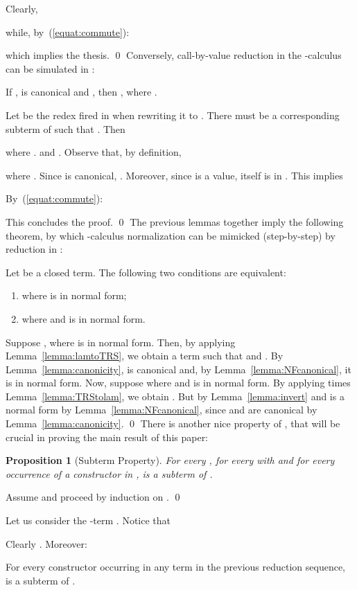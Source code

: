 \documentclass{LMCS}
\newtheorem{proposition}{Proposition}
\begin{document}
Clearly,

while, by~(\ref{equat:commute}):

which implies the thesis.
\qed
Conversely, call-by-value reduction in the -calculus can be simulated in :
\begin{lem}\label{lemma:lamtoTRS}
If ,  is canonical and , then
, where .
\end{lem}
\proof
Let  be the redex fired in  when rewriting
it to . There must be a corresponding subterm  of  such
that . Then

where .
and . Observe that, by definition,

where . Since  is canonical, 
. Moreover, since  is a value,
 itself is in . This implies
   
By~(\ref{equat:commute}):

This concludes the proof.
\qed
The previous lemmas together imply the following theorem, by which -calculus
normalization can be mimicked (step-by-step) by reduction in :
\begin{thm}\label{theo:termreducible}
Let  be a closed term. The following
two conditions are equivalent:
\begin{enumerate}[\em 1.]
\item
   where  is in normal form;
\item
   where
   and  is in normal form.
\end{enumerate}
\end{thm}
\proof
Suppose , where  is in normal form. 
Then, by applying Lemma~\ref{lemma:lamtoTRS}, we obtain a term  such that
 and .
By Lemma~\ref{lemma:canonicity},  is canonical and, by Lemma~\ref{lemma:NFcanonical}, 
it is in normal form. Now, suppose  where
 and  is in normal form. By
applying  times Lemma~\ref{lemma:TRStolam}, we obtain
.
But  by Lemma~\ref{lemma:invert}
and  is a normal form by Lemma~\ref{lemma:NFcanonical}, since  and  are
canonical by Lemma~\ref{lemma:canonicity}.
\qed
There is another nice property of , that will be crucial in proving the main
result of this paper:
\begin{proposition}[Subterm Property]\label{prop:constred}
For every , for every  with 
and for every occurrence of a constructor  in ,  is
a subterm of .
\end{proposition}
\proof
Assume  and proceed
by induction on .
\qed
\begin{exa}
Let us consider the -term . Notice that 

Clearly . Moreover:

For every constructor  occurring in any term in the previous
reduction sequence,  is a subterm of . 
\end{exa}
\end{document}
